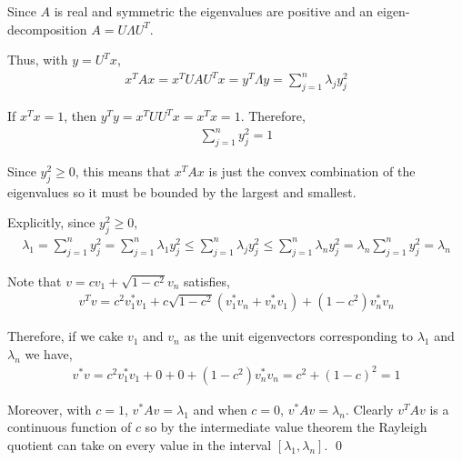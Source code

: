 \documentclass[10pt]{article}
\begin{document}
\begin{solution}[Solution]
Since \( A \) is real and symmetric the eigenvalues are positive and an eigen-decomposition \( A = U\Lambda U^T \).

Thus, with \( y = U^Tx \),
\begin{align*}
    x^TAx = x^TUAU^Tx = y^T\Lambda y = \sum_{j=1}^{n} \lambda_j y_j^2
\end{align*}

If \( x^Tx = 1 \), then \( y^Ty = x^TUU^Tx = x^Tx = 1 \). Therefore,
\begin{align*}
    \sum_{j=1}^{n} y_j^2 = 1
\end{align*}

Since \( y_j^2 \geq 0 \), this means that \( x^TAx \) is just the convex combination of the eigenvalues so it must be bounded by the largest and smallest.

Explicitly, since \( y_j^2 \geq 0 \),
\begin{align*}
    \lambda_1
    = \sum_{j=1}^{n} y_j^2
    = \sum_{j=1}^{n} \lambda_1 y_j^2
    \leq \sum_{j=1}^{n} \lambda_j y_j^2
    \leq \sum_{j=1}^{n} \lambda_n y_j^2
    = \lambda_n \sum_{j=1}^{n} y_j^2
    = \lambda_n
\end{align*}

Note that \( v = c v_1 + \sqrt{1-c^2} v_n \) satisfies,
\begin{align*}
    v^Tv = c^2 v_1^*v_1 + c\sqrt{1-c^2} (v_1^*v_n + v_n^*v_1) + (1-c^2)v_n^*v_n
\end{align*}

Therefore, if we cake \( v_1 \) and \( v_n \) as the unit eigenvectors corresponding to \( \lambda_1 \) and \( \lambda_n \) we have,
\begin{align*}
    v^*v = c^2 v_1^*v_1 + 0 + 0 + (1-c^2)v_n^*v_n = c^2 + (1-c)^2 = 1
\end{align*}

Moreover, with \( c = 1 \), \( v^*Av = \lambda_1 \) and when \( c=0 \), \( v^*Av = \lambda_n \). Clearly \( v^TAv \) is a continuous function of \( c \) so by the intermediate value theorem the Rayleigh quotient can take on every value in the interval \( [\lambda_1, \lambda_n] \). \qed

\end{solution}
\end{document}
